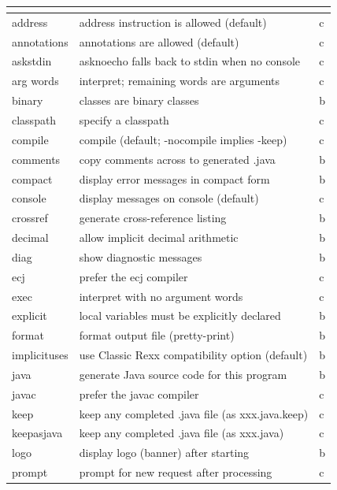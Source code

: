 \begin{longtable}[l]{|l|p{10cm}|l|}
\endlastfoot
\rowcolor[gray]{0.8} \bfseries \huge   & \normalsize  &  \\
\hline
address & address instruction is allowed (default) & c \\
\hline
annotations & annotations are allowed (default) & c \\
\hline
askstdin & asknoecho falls back to stdin when no console & c \\
\hline
arg words & interpret; remaining words are arguments & c \\
\hline
binary &  classes are binary classes & b \\
\hline
 classpath  & specify a classpath & c \\
\hline
 compile  & compile (default; -nocompile implies -keep) & c \\
\hline
 comments     & copy comments across to generated .java &b \\
\hline
 compact      & display error messages in compact form &b \\
\hline
 console   & display messages on console (default) &c \\
\hline
 crossref     & generate cross-reference listing &b \\
\hline
 decimal      & allow implicit decimal arithmetic &b \\
\hline
 diag         & show diagnostic messages &b \\
\hline
 ecj        & prefer the ecj compiler &c \\
\hline
 exec        & interpret with no argument words &c \\
\hline
explicit     & local variables must be explicitly declared &b \\
\hline
format       & format output file (pretty-print) &b \\
\hline
implicituses & use Classic Rexx compatibility option (default) &b \\ 
\hline
 java         & generate Java source code for this program &b \\
\hline
 javac         & prefer the javac compiler &c \\
\hline
 keep         & keep any completed .java file (as xxx.java.keep) &c \\
\hline
keepasjava   & keep any completed .java file (as xxx.java) &c \\
\hline
 logo         & display logo (banner) after starting &b \\
\hline
prompt       & prompt for new request after processing &c \\

\end{longtable}

